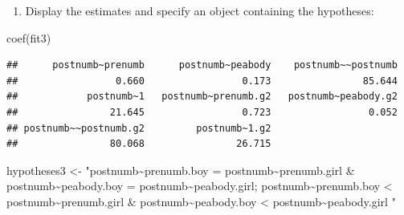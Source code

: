 \documentclass[
]{book}
\newenvironment{Shaded}{\begin{snugshade}}{\end{snugshade}}
\newcommand{\AttributeTok}[1]{\textcolor[rgb]{0.77,0.63,0.00}{#1}}
\newcommand{\CommentTok}[1]{\textcolor[rgb]{0.56,0.35,0.01}{\textit{#1}}}
\newcommand{\ConstantTok}[1]{\textcolor[rgb]{0.00,0.00,0.00}{#1}}
\newcommand{\FunctionTok}[1]{\textcolor[rgb]{0.00,0.00,0.00}{#1}}
\newcommand{\NormalTok}[1]{#1}
\newcommand{\OtherTok}[1]{\textcolor[rgb]{0.56,0.35,0.01}{#1}}
\newcommand{\SpecialCharTok}[1]{\textcolor[rgb]{0.00,0.00,0.00}{#1}}
\newcommand{\StringTok}[1]{\textcolor[rgb]{0.31,0.60,0.02}{#1}}
\providecommand{\tightlist}{%
  \setlength{\itemsep}{0pt}\setlength{\parskip}{0pt}}
\begin{document}
\begin{Shaded}
\end{Shaded}

\begin{enumerate}
\def\labelenumi{\arabic{enumi})}
\setcounter{enumi}{1}
\tightlist
\item
  Display the estimates and specify an object containing the hypotheses:
\end{enumerate}

\begin{Shaded}
\begin{Highlighting}[]
\FunctionTok{coef}\NormalTok{(fit3)}
\end{Highlighting}
\end{Shaded}

\begin{verbatim}
##      postnumb~prenumb      postnumb~peabody    postnumb~~postnumb 
##                 0.660                 0.173                85.644 
##            postnumb~1   postnumb~prenumb.g2   postnumb~peabody.g2 
##                21.645                 0.723                 0.052 
## postnumb~~postnumb.g2         postnumb~1.g2 
##                80.068                26.715
\end{verbatim}

\begin{Shaded}
\begin{Highlighting}[]
\NormalTok{hypotheses3 }\OtherTok{\textless{}{-}}
\StringTok{"postnumb\textasciitilde{}prenumb.boy = postnumb\textasciitilde{}prenumb.girl \& postnumb\textasciitilde{}peabody.boy = postnumb\textasciitilde{}peabody.girl;}
\StringTok{ postnumb\textasciitilde{}prenumb.boy \textless{} postnumb\textasciitilde{}prenumb.girl \& postnumb\textasciitilde{}peabody.boy \textless{} postnumb\textasciitilde{}peabody.girl}
\StringTok{"}
\end{Highlighting}
\end{Shaded}
\end{document}
